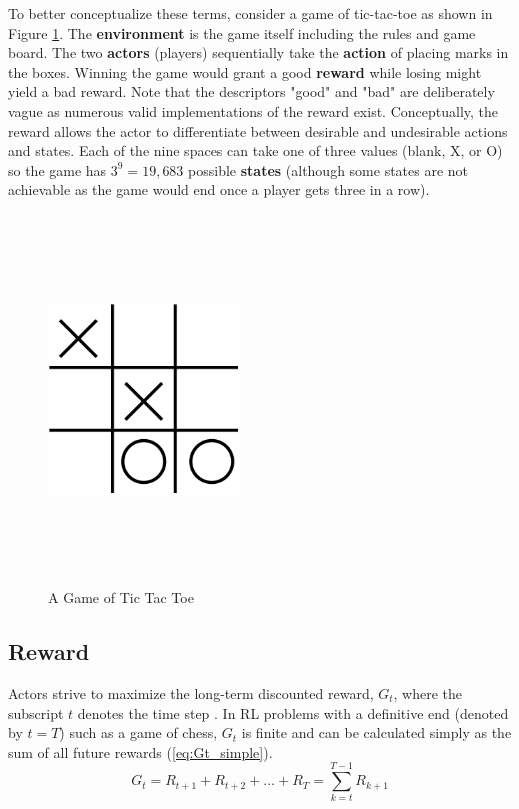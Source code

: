 To better conceptualize these terms, consider a game of tic-tac-toe as shown in Figure \ref{fig:tictactoe}. The \textbf{environment} is the game itself including the rules and game board. The two \textbf{actors} (players) sequentially take the \textbf{action} of placing marks in the boxes. Winning the game would grant a good \textbf{reward} while losing might yield a bad reward. Note that the descriptors "good" and "bad" are deliberately vague as numerous valid implementations of the reward exist. Conceptually, the reward allows the actor to differentiate between desirable and undesirable actions and states. Each of the nine spaces can take one of three values (blank, X, or O) so the game has $3^9=19,683$ possible \textbf{states} (although some states are not achievable as the game would end once a player gets three in a row).
\begin{figure}[H]   %
	\centering \includegraphics[width=2in, height=3.85in, keepaspectratio]{figures/tictactoe.pdf}
	\caption{A Game of Tic Tac Toe}\label{fig:tictactoe}
\end{figure}

\subsection{Reward}
Actors strive to maximize the long-term discounted reward, $G_t$, where the subscript $t$ denotes the time step \cite{sutton_2017}. In RL problems with a definitive end (denoted by $t=T$) such as a game of chess, $G_t$ is finite and can be calculated simply as the sum of all future rewards (\ref{eq:Gt_simple}). 
\begin{equation}
	\label{eq:Gt_simple}
	G_t=R_{t+1}+R_{t+2}+\dots + R_{T}=\sum_{k=t}^{T-1} R_{k+1}
\end{equation}

